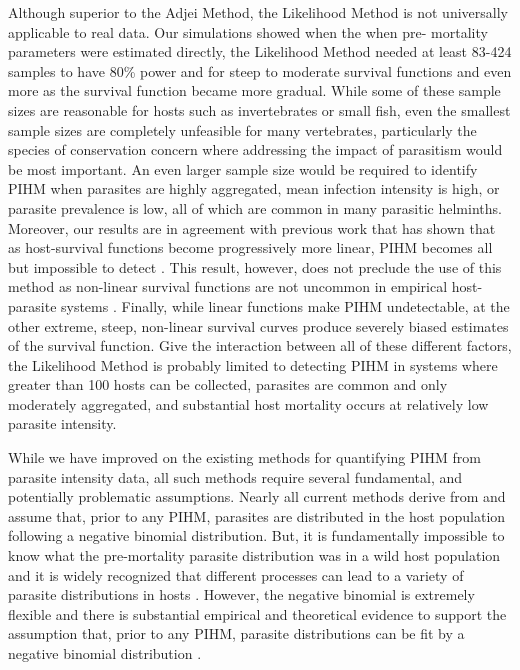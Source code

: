 \documentclass[12pt, a4paper]{article}
\begin{document}
Although superior to the Adjei Method, the Likelihood Method is not universally applicable to real data.  Our simulations showed when the when pre-
mortality parameters were estimated directly, the Likelihood Method needed at
least 83-424 samples to have 80\% power and for steep to moderate survival functions and even
more as the survival function became more gradual. While some of these sample sizes are reasonable for hosts such as invertebrates or small fish, even the smallest sample sizes are completely
unfeasible for many vertebrates, particularly the species of conservation
concern where addressing the impact of parasitism would be most important. An
even larger sample size would be required to identify PIHM when parasites are highly aggregated, mean infection intensity is
high, or parasite prevalence is low, all of which are
common in many parasitic helminths.  Moreover, our results are in agreement with previous work that has shown that as host-survival functions become progressively more linear, PIHM becomes all but impossible to detect \citep{Lanciani1989}.  This result, however, does not preclude the use of this method as non-linear survival functions
are not uncommon in empirical host-parasite systems \citep{Benesh2011}.  Finally,
while linear functions make PIHM undetectable, at the other extreme, steep,
non-linear survival curves produce severely biased estimates of the survival
function. Give the interaction between all of these different factors, the
Likelihood Method is probably limited to detecting PIHM in systems where greater than 100 hosts can be collected, parasites are
common and only moderately aggregated, and substantial host mortality occurs at relatively low parasite intensity.

While we have improved on the existing methods for quantifying
PIHM from parasite intensity data, all such methods require several
fundamental, and potentially problematic assumptions.  Nearly all current methods derive from \cite{Crofton1971a} \citep[but see][]{Ferguson2011} and assume that, prior to any PIHM, parasites are distributed in the host population following a
negative binomial distribution. But, it is fundamentally impossible to know
what the pre-mortality parasite distribution was in a wild host population and
it is widely recognized that different processes can lead to a variety of
parasite distributions in hosts \citep{Anderson1982a, Duerr2003}. However, the negative binomial is extremely
flexible and there is substantial empirical and theoretical evidence to support
the assumption that, prior to any PIHM, parasite distributions can be fit by a negative binomial distribution \citep{Shaw1995,Shaw1998,Wilson2002}.
\end{document}
